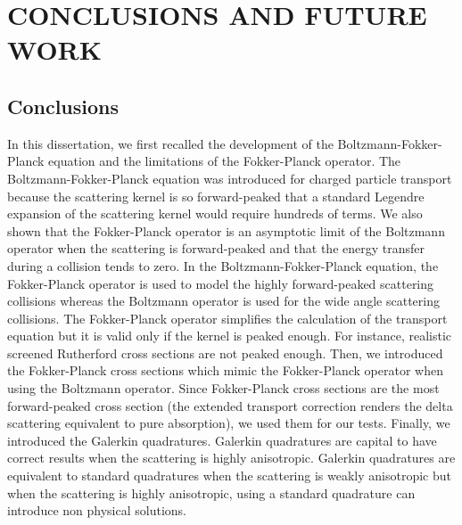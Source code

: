 \chapter{\uppercase{Conclusions and future work}}\label{conclusion_chapter}
\section{Conclusions}
In this dissertation, we first recalled the development of the
Boltzmann-Fokker-Planck equation and the limitations of the Fokker-Planck operator.
The Boltzmann-Fokker-Planck equation was introduced for charged particle transport
because the scattering kernel is so forward-peaked that a standard Legendre
expansion of the scattering kernel would require hundreds of terms. We also
shown that the Fokker-Planck operator is an asymptotic limit of the Boltzmann 
operator when the scattering is forward-peaked and that the energy transfer 
during a collision tends to zero. In the Boltzmann-Fokker-Planck equation, the 
Fokker-Planck operator is used to model 
the highly forward-peaked scattering collisions whereas the Boltzmann operator 
is used for the wide angle scattering collisions. The Fokker-Planck operator 
simplifies the calculation of the transport equation but it is valid only if 
the kernel is peaked enough. For instance, realistic screened Rutherford 
cross sections are not peaked enough. Then, we introduced the Fokker-Planck 
cross sections which mimic the Fokker-Planck operator when using the Boltzmann
operator. Since Fokker-Planck cross sections are the most forward-peaked cross
section (the extended transport correction renders the delta scattering equivalent 
to pure absorption), we used them for our tests. Finally, we introduced the Galerkin 
quadratures. Galerkin quadratures are capital to have correct results when 
the scattering is highly anisotropic. Galerkin quadratures are equivalent
to standard quadratures when the scattering is weakly anisotropic but when the
scattering is highly anisotropic, using a standard quadrature can introduce
non physical solutions.

